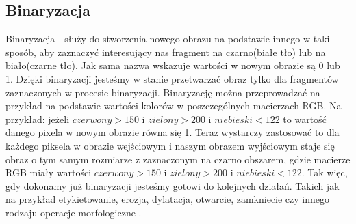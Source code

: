 \documentclass{article}
\begin{document}
        \subsection{Binaryzacja}
        {
            \label{sec:binaryzacja}
            \Large
            \justifying
            \quad
            Binaryzacja - służy do stworzenia nowego obrazu na podstawie innego w taki sposób, aby zaznaczyć interesujący nas fragment na czarno(białe tło)
            lub na biało(czarne tło). Jak sama nazwa wskazuje wartości w nowym obrazie są 0 lub 1. Dzięki binaryzacji jesteśmy w stanie przetwarzać obraz
            tylko dla fragmentów zaznaczonych w procesie binaryzacji. Binaryzację można przeprowadzać na przykład na podstawie wartości kolorów w poszczególnych
            macierzach RGB. Na przykład: 
            jeżeli \(czerwony > 150\) i \(zielony > 200\) i \(niebieski < 122\) to wartość danego pixela w nowym obrazie równa się 1.
            Teraz wystarczy zastosować to dla każdego piksela w obrazie wejściowym i naszym obrazem wyjściowym staje się obraz o tym samym rozmiarze
            z zaznaczonym na czarno obszarem, gdzie macierze RGB miały wartości \(czerwony > 150\) i \(zielony > 200\) i \(niebieski < 122\).
            Tak więc, gdy dokonamy już binaryzacji jesteśmy gotowi do kolejnych działań.
            Takich jak na przykład etykietowanie, erozja, dylatacja, otwarcie, zamkniecie czy innego rodzaju operacje morfologiczne \cite{Digital Image Processing Second Edition}.
        }
\end{document}
